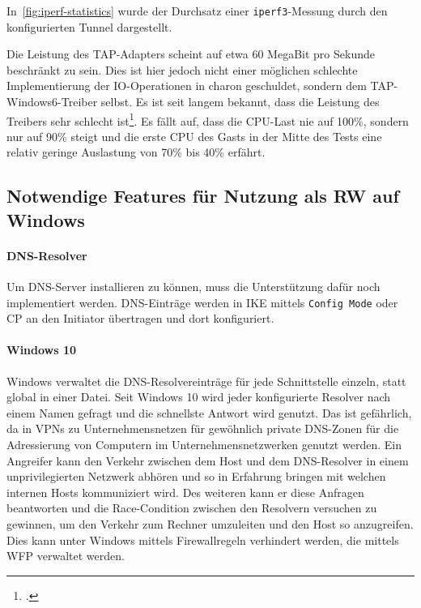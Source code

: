 In~\autoref{fig:iperf-statistics} wurde der Durchsatz einer \texttt{iperf3}-Messung
durch den konfigurierten Tunnel dargestellt.

Die Leistung des TAP-Adapters scheint auf etwa 60 MegaBit pro Sekunde beschränkt zu sein.
Dies ist hier jedoch nicht einer möglichen schlechte Implementierung der IO-Operationen in charon
geschuldet, sondern dem TAP-Windows6-Treiber selbst. Es ist seit langem bekannt, dass die
Leistung des Treibers sehr schlecht ist\footcite[][]{_openvpn_2015}.
Es fällt auf, dass die \ac{CPU}-Last nie auf 100\%, sondern nur auf 90\%
steigt und die erste CPU des Gasts in der Mitte des Tests eine relativ geringe Auslastung von
70\% bis 40\% erfährt.

\subsection{Notwendige Features für Nutzung als RW auf Windows}

\paragraph{DNS-Resolver}
Um DNS-Server installieren zu können, muss die Unterstützung dafür noch implementiert werden.
DNS-Einträge werden in IKE mittels \texttt{Config Mode} oder \ac{CP} an den Initiator übertragen
und dort konfiguriert.
\paragraph{Windows 10}
Windows verwaltet die DNS-Resolvereinträge für jede Schnittstelle einzeln, statt
global in einer Datei. Seit Windows 10 wird jeder konfigurierte Resolver nach einem Namen
gefragt und die schnellste Antwort wird genutzt. Das ist gefährlich, da in VPNs 
zu Unternehmensnetzen für gewöhnlich private DNS-Zonen für die Adressierung
von Computern im Unternehmensnetzwerken genutzt werden. Ein Angreifer kann
den Verkehr zwischen dem Host und dem DNS-Resolver in einem unprivilegierten
Netzwerk abhören und so in Erfahrung bringen mit welchen internen Hosts kommuniziert wird.
Des weiteren kann er diese Anfragen beantworten und die Race-Condition zwischen den
Resolvern versuchen zu gewinnen, um den Verkehr zum Rechner umzuleiten und
den Host so anzugreifen. Dies kann unter Windows mittels Firewallregeln
verhindert werden, die mittels \ac{WFP} verwaltet werden.

